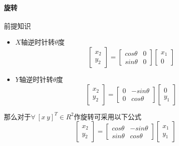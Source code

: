 \documentclass[12pt]{article}
\begin{document}
\begin{CJK}{UTF8}{gbsn}
\paragraph{旋转}
前提知识
\begin{itemize}
\item $X$轴逆时针转$\theta$度
\begin{equation}
\left[
\begin{array}{c}
x_2\\
y_2
\end{array}
\right]
=
\left[
\begin{array}{cc}
cos\theta & 0\\
sin\theta & 0
\end{array}
\right]
\left[
\begin{array}{c}
x_1\\
0
\end{array}
\right]
\end{equation}
\item $Y$轴逆时针转$\theta$度
\begin{equation}
\left[
\begin{array}{c}
x_2\\
y_2
\end{array}
\right]
=
\left[
\begin{array}{cc}
0 & -sin\theta\\
0 & cos\theta
\end{array}
\right]
\left[
\begin{array}{c}
0\\
y_1
\end{array}
\right]
\end{equation}
\end{itemize}
那么对于$\forall\ [x\ y]^T \in R^2$作旋转可采用以下公式
\begin{equation}
\left[
\begin{array}{c}
x_2\\
y_2
\end{array}
\right]
=
\left[
\begin{array}{cc}
cos\theta & -sin\theta\\
sin\theta & cos\theta
\end{array}
\right]
\left[
\begin{array}{c}
x_1\\
y_1
\end{array}
\right]
\end{equation}


\end{CJK}
\end{document}
